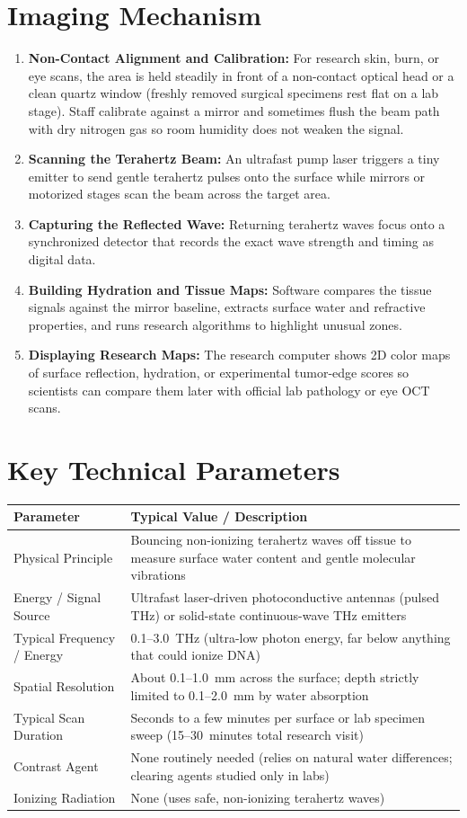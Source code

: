 \section{Imaging Mechanism}
\begin{enumerate}
  \item \textbf{Non-Contact Alignment and Calibration:} For research skin, burn, or eye scans, the area is held steadily in front of a non-contact optical head or a clean quartz window (freshly removed surgical specimens rest flat on a lab stage). Staff calibrate against a mirror and sometimes flush the beam path with dry nitrogen gas so room humidity does not weaken the signal.
  \item \textbf{Scanning the Terahertz Beam:} An ultrafast pump laser triggers a tiny emitter to send gentle terahertz pulses onto the surface while mirrors or motorized stages scan the beam across the target area.
  \item \textbf{Capturing the Reflected Wave:} Returning terahertz waves focus onto a synchronized detector that records the exact wave strength and timing as digital data.
  \item \textbf{Building Hydration and Tissue Maps:} Software compares the tissue signals against the mirror baseline, extracts surface water and refractive properties, and runs research algorithms to highlight unusual zones.
  \item \textbf{Displaying Research Maps:} The research computer shows 2D color maps of surface reflection, hydration, or experimental tumor-edge scores so scientists can compare them later with official lab pathology or eye OCT scans.
\end{enumerate}

\section{Key Technical Parameters}
\noindent
\begin{tabularx}{\textwidth}{@{}l X@{}}
\toprule
\textbf{Parameter} & \textbf{Typical Value / Description} \\
\midrule
Physical Principle & Bouncing non-ionizing terahertz waves off tissue to measure surface water content and gentle molecular vibrations \\
Energy / Signal Source & Ultrafast laser-driven photoconductive antennas (pulsed THz) or solid-state continuous-wave THz emitters \\
Typical Frequency / Energy & 0.1--3.0~THz (ultra-low photon energy, far below anything that could ionize DNA) \\
Spatial Resolution & About 0.1--1.0~mm across the surface; depth strictly limited to 0.1--2.0~mm by water absorption \\
Typical Scan Duration & Seconds to a few minutes per surface or lab specimen sweep (15--30~minutes total research visit) \\
Contrast Agent & None routinely needed (relies on natural water differences; clearing agents studied only in labs) \\
Ionizing Radiation & None (uses safe, non-ionizing terahertz waves) \\
\bottomrule
\end{tabularx}

